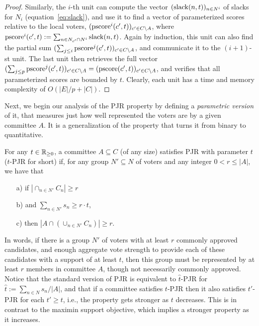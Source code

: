 \begin{proof}
Similarly, the $i$-th unit can compute the vector $(\operatorname{slack}(n,t))_{n\in N^i}$ of slacks for $N_i$ (equation~\ref{eq:slack}), and use it to find a vector of parameterized scores relative to the local voters, $(\operatorname{pscore}^i(c',t))_{c'\in C\setminus A}$, where $\operatorname{pscore}^i(c', t):=\sum_{n\in N_{c'}\cap N^i} \operatorname{slack}(n,t)$. 
Again by induction, this unit can also find the partial sum $(\sum_{j\leq i}\operatorname{pscore}^j(c',t))_{c'\in C\setminus A}$, and communicate it to the $(i+1)$-st unit. 
The last unit then retrieves the full vector $(\sum_{j\leq p}\operatorname{pscore}^j(c',t))_{c'\in C\setminus A}=(\operatorname{pscore}(c',t))_{c'\in C\setminus A}$, and verifies that all parameterized scores are bounded by $t$. 
Clearly, each unit has a time and memory complexity of $O(|E|/p + |C|)$.
\end{proof}

Next, we begin our analysis of the PJR property by defining a \emph{parametric version} of it, that measures just how well represented the voters are by a given committee $A$. It is a generalization of the property that turns it from binary to quantitative.

\begin{definition}
For any $t\in\mathbb{R}_{\geq 0}$, a committee $A\subseteq C$ (of any size) satisfies PJR with parameter $t$ ($t$-PJR for short) if, for any group $N'\subseteq N$ of voters and any integer $0<r\leq |A|$, we have that
\begin{itemize}
\item[a)] if $|\cap_{n\in N'} C_n|\geq r$
\item[b)] and $\sum_{n\in N'} s_n \geq r\cdot t$, 
\item[c)] then $|A\cap (\cup_{n\in N'} C_n)|\geq r$.
\end{itemize}
\end{definition}

In words, if there is a group $N'$ of voters with at least $r$ commonly approved candidates, and enough aggregate vote strength to provide each of these candidates with a support of at least $t$, then this group must be represented by at least $r$ members in committee $A$, though not necessarily commonly approved. 
Notice that the standard version of PJR is equivalent to $\hat{t}$-PJR for $\hat{t}:=\sum_{n\in N} s_n / |A|$, and that if a committee satisfies $t$-PJR then it also satisfies $t'$-PJR for each $t'\geq t$, i.e., the property gets stronger as $t$ decreases. 
This is in contrast to the maximin support objective, which implies a stronger property as it increases.

